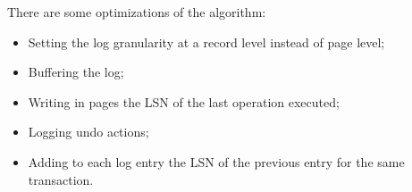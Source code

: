 There are some optimizations of the algorithm:
\begin{itemize}
    \item Setting the log granularity at a record level instead of page level;

    \item Buffering the log;

    \item Writing in pages the LSN of the last operation executed;

    \item Logging undo actions;

    \item Adding to each log entry the LSN of the previous entry for the same transaction.
\end{itemize}